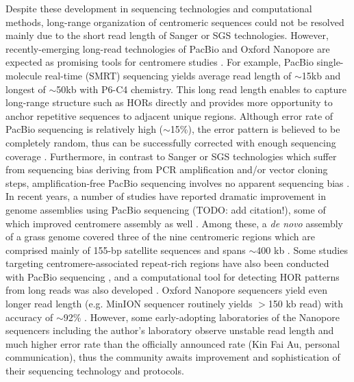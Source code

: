 Despite these development in sequencing technologies and computational methods, long-range organization of centromeric sequences could not be resolved mainly due to the short read length of Sanger or SGS technologies. However, recently-emerging long-read technologies of PacBio \cite{Eid2009} and Oxford Nanopore \cite{Jain2016} are expected as promising tools for centromere studies \cite{Aldrup-MacDonald2014, Miga2015}. For example, PacBio single-molecule real-time (SMRT) sequencing yields average read length of $\sim$15kb and longest of $\sim$50kb with P6-C4 chemistry. This long read length enables to capture long-range structure such as HORs directly and provides more opportunity to anchor repetitive sequences to adjacent unique regions. Although error rate of PacBio sequencing is relatively high ($\sim$15\%), the error pattern is believed to be completely random, thus can be successfully corrected with enough sequencing coverage \cite{Myers2014}. Furthermore, in contrast to Sanger or SGS technologies which suffer from sequencing bias deriving from PCR amplification and/or vector cloning steps, amplification-free PacBio sequencing involves no apparent sequencing bias \cite{Ross2013}. In recent years, a number of studies have reported dramatic improvement in genome assemblies using PacBio sequencing (TODO: add citation!), some of which improved centromere assembly as well \cite{VanBuren2015, Vij2016, Jiao2016}. Among these, a \textit{de novo} assembly of a grass genome covered three of the nine centromeric regions which are comprised mainly of 155-bp satellite sequences and spans $\sim$400 kb \cite{VanBuren2015}. Some studies targeting centromere-associated repeat-rich regions have also been conducted with PacBio sequencing \cite{Wolfgruber2016, Khost2016}, and a computational tool for detecting HOR patterns from long reads was also developed \cite{Sevim2016}. Oxford Nanopore sequencers yield even longer read length (e.g. MinION sequencer routinely yields $>$150 kb read) with accuracy of $\sim$92\% \cite{Jain2016}. However, some early-adopting laboratories of the Nanopore sequencers including the author's laboratory observe unstable read length and much higher error rate than the officially announced rate (Kin Fai Au, personal communication), thus the community awaits improvement and sophistication of their sequencing technology and protocols.

